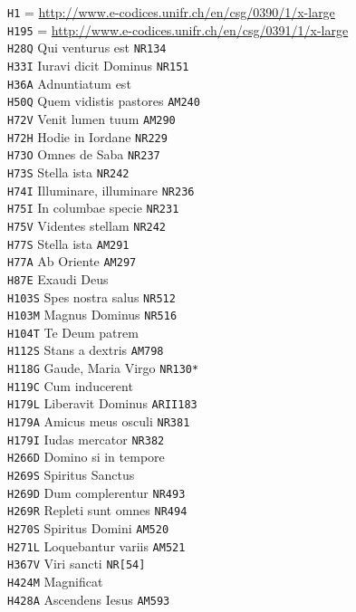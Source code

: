 \documentclass[a4paper]{article}
\begin{document}
{\begin{multicols}{2}
\noindent
\texttt{H1} = \url{http://www.e-codices.unifr.ch/en/csg/0390/1/x-large}\\
\texttt{H195} = \url{http://www.e-codices.unifr.ch/en/csg/0391/1/x-large}\\
\texttt{H28Q} Qui venturus est \texttt{NR134}\\
\texttt{H33I} Iuravi dicit Dominus \texttt{NR151}\\
\texttt{H36A} Adnuntiatum est\\
\texttt{H50Q} Quem vidistis pastores \texttt{AM240}\\
\texttt{H72V} Venit lumen tuum \texttt{AM290}\\
\texttt{H72H} Hodie in Iordane \texttt{NR229}\\
\texttt{H73O} Omnes de Saba \texttt{NR237}\\
\texttt{H73S} Stella ista \texttt{NR242}\\
\texttt{H74I} Illuminare, illuminare \texttt{NR236}\\
\texttt{H75I} In columbae specie \texttt{NR231}\\
\texttt{H75V} Videntes stellam \texttt{NR242}\\
\texttt{H77S} Stella ista \texttt{AM291}\\
\texttt{H77A} Ab Oriente \texttt{AM297}\\
\texttt{H87E} Exaudi Deus\\
\texttt{H103S} Spes nostra salus \texttt{NR512}\\
\texttt{H103M} Magnus Dominus \texttt{NR516}\\
\texttt{H104T} Te Deum patrem\\
\texttt{H112S} Stans a dextris \texttt{AM798}\\
\texttt{H118G} Gaude, Maria Virgo \texttt{NR130*}\\
\texttt{H119C} Cum inducerent\\
\texttt{H179L} Liberavit Dominus \texttt{ARII183}\\
\texttt{H179A} Amicus meus osculi \texttt{NR381}\\
\texttt{H179I} Iudas mercator \texttt{NR382}\\
\texttt{H266D} Domino si in tempore\\
\texttt{H269S} Spiritus Sanctus\\
\texttt{H269D} Dum complerentur \texttt{NR493}\\
\texttt{H269R} Repleti sunt omnes \texttt{NR494}\\
\texttt{H270S} Spiritus Domini \texttt{AM520}\\
\texttt{H271L} Loquebantur variis \texttt{AM521}\\
\texttt{H367V} Viri sancti \texttt{NR[54]}\\
\texttt{H424M} Magnificat\\
\texttt{H428A} Ascendens Iesus \texttt{AM593}


\end{multicols}}
\end{document}

